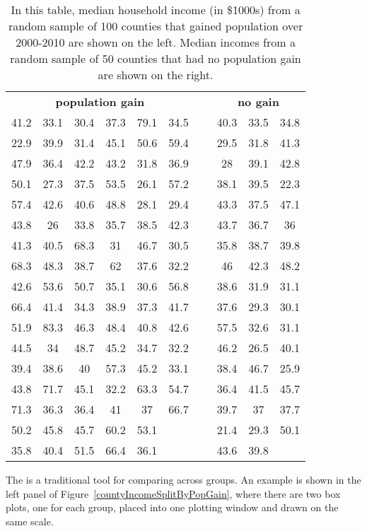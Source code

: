 \begin{table}
\centering
\begin{tabular}{ ccc ccc c ccc }
\multicolumn{6}{c}{\bf population gain} && \multicolumn{3}{c}{\bf no gain} \\ 
  \cline{1-6} \cline{8-10}
41.2 & 33.1 & 30.4 & 37.3 & 79.1 & 34.5 &\hspace{5mm}\ & 40.3 & 33.5 & 34.8 \\
22.9 & 39.9 & 31.4 & 45.1 & 50.6 & 59.4 && 29.5 & 31.8 & 41.3 \\
47.9 & 36.4 & 42.2 & 43.2 & 31.8 & 36.9 && 28 & 39.1 & 42.8 \\
50.1 & 27.3 & 37.5 & 53.5 & 26.1 & 57.2 && 38.1 & 39.5 & 22.3 \\
57.4 & 42.6 & 40.6 & 48.8 & 28.1 & 29.4 && 43.3 & 37.5 & 47.1 \\
43.8 & 26 & 33.8 & 35.7 & 38.5 & 42.3 && 43.7 & 36.7 & 36 \\
41.3 & 40.5 & 68.3 & 31 & 46.7 & 30.5 && 35.8 & 38.7 & 39.8 \\
68.3 & 48.3 & 38.7 & 62 & 37.6 & 32.2 && 46 & 42.3 & 48.2 \\
42.6 & 53.6 & 50.7 & 35.1 & 30.6 & 56.8 && 38.6 & 31.9 & 31.1 \\
66.4 & 41.4 & 34.3 & 38.9 & 37.3 & 41.7 && 37.6 & 29.3 & 30.1 \\
51.9 & 83.3 & 46.3 & 48.4 & 40.8 & 42.6 && 57.5 & 32.6 & 31.1 \\
44.5 & 34 & 48.7 & 45.2 & 34.7 & 32.2 && 46.2 & 26.5 & 40.1 \\
39.4 & 38.6 & 40 & 57.3 & 45.2 & 33.1 && 38.4 & 46.7 & 25.9 \\
43.8 & 71.7 & 45.1 & 32.2 & 63.3 & 54.7 && 36.4 & 41.5 & 45.7 \\
71.3 & 36.3 & 36.4 & 41 & 37 & 66.7 && 39.7 & 37 & 37.7 \\
50.2 & 45.8 & 45.7 & 60.2 & 53.1 &  && 21.4 & 29.3 & 50.1 \\
35.8 & 40.4 & 51.5 & 66.4 & 36.1 &  && 43.6 & 39.8 &  \\
\cline{1-6} \cline{8-10}
\end{tabular}
\caption{In this table, median household income (in \$1000s) from a random sample of 100 counties that gained population over 2000-2010 are shown on the left. Median incomes from a random sample of 50 counties that had no population gain are shown on the right.}
\label{countyIncomeSplitByPopGainTable}
\end{table}

The   is a traditional tool for comparing across groups. An example is shown in the left panel of Figure~\ref{countyIncomeSplitByPopGain}, where there are two box plots, one for each group, placed into one plotting window and drawn on the same scale.

